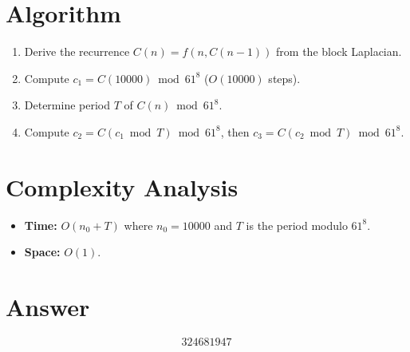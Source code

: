\documentclass[12pt]{article}
\begin{document}
\section{Algorithm}

\begin{enumerate}
    \item Derive the recurrence $C(n) = f(n, C(n-1))$ from the block Laplacian.
    \item Compute $c_1 = C(10000) \bmod 61^8$ ($O(10000)$ steps).
    \item Determine period $T$ of $C(n) \bmod 61^8$.
    \item Compute $c_2 = C(c_1 \bmod T) \bmod 61^8$, then $c_3 = C(c_2 \bmod T) \bmod 61^8$.
\end{enumerate}

\section{Complexity Analysis}

\begin{itemize}
    \item \textbf{Time:} $O(n_0 + T)$ where $n_0 = 10000$ and $T$ is the period modulo $61^8$.
    \item \textbf{Space:} $O(1)$.
\end{itemize}

\section{Answer}

\[
\boxed{324681947}
\]
\end{document}
